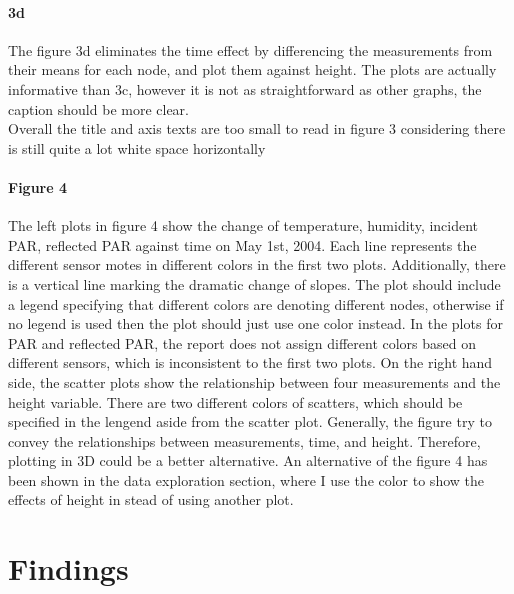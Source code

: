 \documentclass[11pt]{article}
\begin{document}
{\paragraph{3d}
The figure 3d eliminates the time effect by differencing the measurements from their means for each node, and plot them against height. The plots are actually informative than 3c, however it is not as straightforward as other graphs, the caption should be more clear.\\
Overall the title and axis texts are too small to read in figure 3 considering there is still quite a lot white space horizontally 
\paragraph{Figure 4}
The left plots in figure 4 show the change of temperature, humidity, incident PAR, reflected PAR against time on May 1st, 2004. Each line represents the different sensor motes in different colors in the first two plots. Additionally, there is a vertical line marking the dramatic change of slopes. The plot should include a legend specifying that different colors are denoting different nodes, otherwise if no legend is used then the plot should just use one color instead. In the plots for PAR and reflected PAR, the report does not assign different colors based on different sensors, which is inconsistent to the first two plots. On the right hand side, the scatter plots show the relationship between four measurements and the height variable. There are two different colors of scatters, which should be specified in the lengend aside from the scatter plot. Generally, the figure try to convey the relationships between measurements, time, and height. Therefore, plotting in 3D could be a better alternative. An alternative of the figure 4 has been shown in the data exploration section, where I use the color to show the effects of height in stead of using another plot.
\section{Findings}
}
\end{document}
